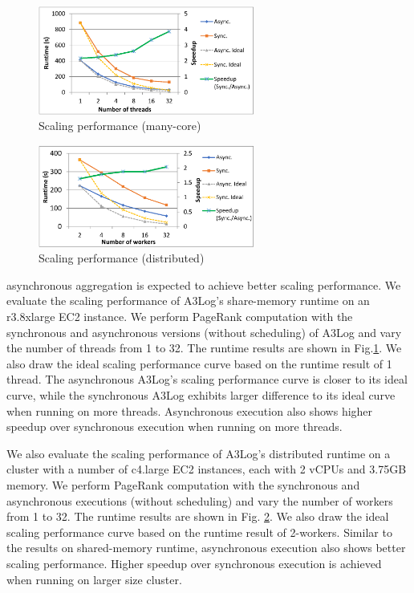  \begin{figure}[!t]
 	\centering
 	\includegraphics[width=2.8in]{fig/single-scalability}
 	\vspace{-0.1in}
 	\caption{Scaling performance (many-core)}
 	\label{fig:single-scalability}
 \end{figure}
 
 \begin{figure}[!t]
 	\centering
 	\includegraphics[width=2.8in]{fig/dist-scalability}
 	\vspace{-0.1in}
 	\caption{Scaling performance (distributed)}
 	\label{fig:dist-scalability}
 \end{figure}
 
 
asynchronous aggregation is expected to achieve better scaling performance. We evaluate the scaling performance of A3Log's share-memory runtime on an r3.8xlarge EC2 instance. We perform PageRank computation with the synchronous and asynchronous versions (without scheduling) of A3Log and vary the number of threads from 1 to 32. The runtime results are shown in Fig.\ref{fig:single-scalability}. We also draw the ideal scaling performance curve based on the runtime result of 1 thread. The asynchronous A3Log's scaling performance curve is closer to its ideal curve, while the synchronous A3Log exhibits larger difference to its ideal curve when running on more threads. Asynchronous execution also shows higher speedup over synchronous execution when running on more threads.
 
 We also evaluate the scaling performance of A3Log's distributed runtime on a cluster with a number of c4.large EC2 instances, each with 2 vCPUs and 3.75GB memory. We perform PageRank computation with the synchronous and asynchronous executions (without scheduling) and vary the number of workers from 1 to 32. The runtime results are shown in Fig. \ref{fig:dist-scalability}. We also draw the ideal scaling performance curve based on the runtime result of 2-workers. Similar to the results on shared-memory runtime, asynchronous execution also shows better scaling performance. Higher speedup over synchronous execution is achieved when running on larger size cluster.


